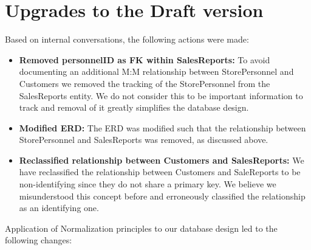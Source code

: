 \documentclass{article}
\begin{document}
\section{Upgrades to the Draft version}

\begin{tcolorbox}[colback=secondarycolor, colframe=primarycolor, arc=5mm]
Based on internal conversations, the following actions were made:
\vspace{0.2cm}
\begin{itemize}
  \item \textbf{Removed personnelID as FK within SalesReports:} To avoid documenting an additional M:M relationship between StorePersonnel and Customers we removed the tracking of the StorePersonnel from the SalesReports entity. We do not consider this to be important information to track and removal of it greatly simplifies the database design.
  \vspace{0.1cm}
  \item \textbf{Modified ERD:} The ERD was modified such that the relationship between StorePersonnel and SalesReports was removed, as discussed above.
  \vspace{0.1cm}
  \item \textbf{Reclassified relationship between Customers and SalesReports:} We have reclassified the relationship between Customers and SaleReports to be non-identifying since they do not share a primary key. We believe we misunderstood this concept before and erroneously classified the relationship as an identifying one.
  \end{itemize}
\vspace{0.2cm}

Application of Normalization principles to our database design led to the following changes:


\end{tcolorbox}
\end{document}
